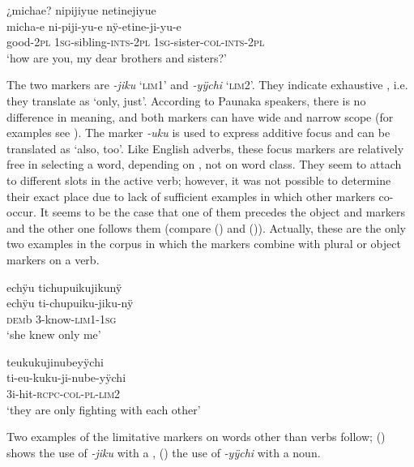\ea\label{ex:FirstINTS-5}
\begingl
\glpreamble ¿michae? nipijiyue netinejiyue\\
\gla micha-e ni-piji-yu-e nÿ-etine-ji-yu-e\\
\glb good-2\textsc{pl} 1\textsc{sg}-sibling-\textsc{ints}-2\textsc{pl} 1\textsc{sg}-sister-\textsc{col}-\textsc{ints}-2\textsc{pl}\\
\glft ‘how are you, my dear brothers and sisters?’
\endgl
\trailingcitation{[mxx-x110916]}
\xe


The two  markers are \textit{-jiku} ‘\textsc{lim}1’ and \textit{-yÿchi} ‘\textsc{lim}2’. They indicate exhaustive , i.e. they translate as ‘only, just’. According to Paunaka speakers, there is no difference in meaning, and both markers can have wide and narrow scope (for examples see ). The  marker \textit{-uku} is used to express additive focus and can be translated as ‘also, too’. Like English adverbs, these focus markers are relatively free in selecting a word, depending on , not on word class. They seem to attach to different slots in the active verb; however, it was not possible to determine their exact place due to lack of sufficient examples in which other markers co-occur. It seems to be the case that one of them precedes the object and  markers and the other one follows them (compare () and ()). Actually, these are the only two examples in the corpus in which the  markers combine with plural or object markers on a verb.

\ea\label{ex:FirstLim-1}
\begingl
\glpreamble echÿu tichupuikujikunÿ\\
\gla echÿu ti-chupuiku-jiku-nÿ\\
\glb \textsc{dem}b 3-know-\textsc{lim}1-1\textsc{sg}\\
\glft ‘she knew only me’
\endgl
\trailingcitation{[ump-p110815sf.011]}
\xe

\ea\label{ex:FirstLim-2}
\begingl
\glpreamble teukukujinubeyÿchi\\
\gla ti-eu-kuku-ji-nube-yÿchi\\
\glb 3i-hit-\textsc{rcpc}-\textsc{col}-\textsc{pl}-\textsc{lim}2\\
\glft ‘they are only fighting with each other’
\endgl
\trailingcitation{[jxx-e120516l-1.089]}
\xe

Two examples of the limitative markers on words other than verbs follow; () shows the use of \textit{-jiku} with a , () the use of \textit{-yÿchi} with a noun.

